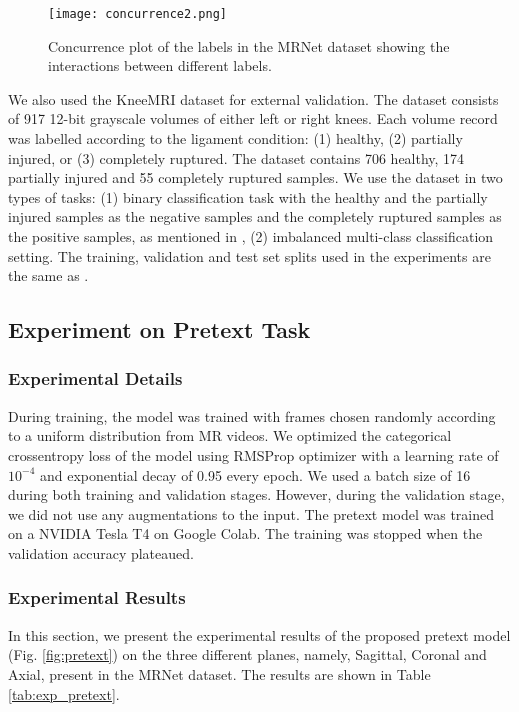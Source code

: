 \documentclass[journal]{IEEEtai}
\begin{document}
\begin{figure}
    \centering
    \texttt{[image: concurrence2.png]}
    \caption{Concurrence plot of the labels in the MRNet dataset showing the interactions between different labels.}
    \label{fig:conplot}
\end{figure}

\indent We also used the KneeMRI \cite{kneemri} dataset for external validation. The dataset consists of 917 12-bit grayscale volumes of either left or right knees. Each volume record was labelled according to the ligament condition: (1) healthy, (2) partially injured, or (3) completely ruptured. The dataset contains 706 healthy, 174 partially injured and 55 completely ruptured samples. We use the dataset in two types of tasks: (1) binary classification task with the healthy and the partially injured samples as the negative samples and the completely ruptured samples as the positive samples, as mentioned in \cite{mrnet}, (2) imbalanced multi-class classification setting. The training, validation and test set splits used in the experiments are the same as \cite{mrnet}. 

\subsection{Experiment on Pretext Task}
\label{subsubsec:exp_pre}

\subsubsection{Experimental Details}
\label{subsubsec:pre_exp_det}
\indent During training, the model was trained with frames chosen randomly according to a uniform distribution from MR videos. We optimized the categorical crossentropy loss of the model using RMSProp optimizer with a learning rate of $10^{-4}$ and exponential decay of 0.95 every epoch. We used a batch size of 16 during both training and validation stages. However, during the validation stage, we did not use any augmentations to the input. The pretext model was trained on a NVIDIA Tesla T4 on Google Colab. The training was stopped when the validation accuracy plateaued.

\subsubsection{Experimental Results}
\label{subsubsec:pre_exp_res}
\indent In this section, we present the experimental results of the proposed pretext model (Fig. \ref{fig:pretext}) on the three different planes, namely, Sagittal, Coronal and Axial, present in the MRNet dataset. The results are shown in Table \ref{tab:exp_pretext}. 
\end{document}
